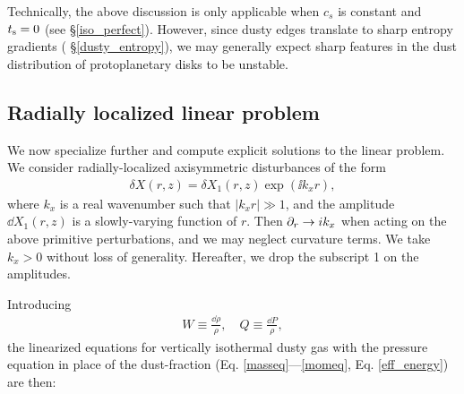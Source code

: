 Technically, the above discussion is only applicable when $c_s$ is
constant and $t_\mathrm{s}=0$ (see \S\ref{iso_perfect}). However, since
dusty edges translate to sharp entropy gradients (
\S\ref{dusty_entropy}), we may generally expect sharp features in the
dust distribution of protoplanetary disks to be unstable.    



\subsection{Radially localized linear problem}
We now specialize further and compute explicit solutions to the linear
problem. We consider radially-localized axisymmetric disturbances of the form  
\begin{align}
  \delta X (r, z) = \delta X_1(r,z)\exp{(\ii k_x r)},
\end{align} 
where $k_x$ is a real wavenumber such that $|k_xr|\gg 1$, and the 
amplitude $\dd X_1(r,z)$ is 
a slowly-varying function of $r$. Then 
$\partial_r\to i k_x$ when acting on the above primitive perturbations, and we may
neglect curvature terms. We take  
$k_x>0$ without loss of generality. Hereafter, we drop the subscript 1
on the amplitudes. 

Introducing 
\begin{align}
  W \equiv \frac{\dd\rho}{\rho}, \quad Q \equiv \frac{\dd P}{\rho},
\end{align}
the linearized equations for 
vertically isothermal dusty gas with the pressure
equation in place of the dust-fraction
(Eq. \ref{masseq}---\ref{momeq}, Eq. \ref{eff_energy}) are then:    

